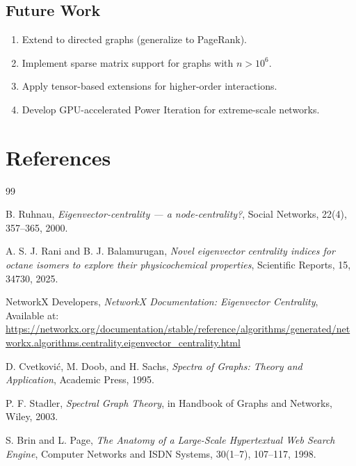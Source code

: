 \documentclass[12pt]{article}
\begin{document}
\subsection{Future Work}

\begin{enumerate}
    \item Extend to directed graphs (generalize to PageRank).
    \item Implement sparse matrix support for graphs with $n > 10^6$.
    \item Apply tensor-based extensions for higher-order interactions.
    \item Develop GPU-accelerated Power Iteration for extreme-scale networks.
\end{enumerate}

\section{References}

\begin{thebibliography}{99}

B. Ruhnau,
\textit{Eigenvector-centrality --- a node-centrality?},
Social Networks, 22(4), 357--365, 2000.

A. S. J. Rani and B. J. Balamurugan,
\textit{Novel eigenvector centrality indices for octane isomers to explore their physicochemical properties},
Scientific Reports, 15, 34730, 2025.

NetworkX Developers,
\textit{NetworkX Documentation: Eigenvector Centrality},
Available at: \url{https://networkx.org/documentation/stable/reference/algorithms/generated/networkx.algorithms.centrality.eigenvector_centrality.html}

D. Cvetković, M. Doob, and H. Sachs,
\textit{Spectra of Graphs: Theory and Application},
Academic Press, 1995.

P. F. Stadler,
\textit{Spectral Graph Theory},
in Handbook of Graphs and Networks, Wiley, 2003.

S. Brin and L. Page,
\textit{The Anatomy of a Large-Scale Hypertextual Web Search Engine},
Computer Networks and ISDN Systems, 30(1--7), 107--117, 1998.

\end{thebibliography}
\end{document}
